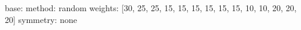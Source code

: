 base:
  method: random
  weights: [30, 25, 25, 15, 15, 15, 15, 15, 15, 10, 10, 20, 20, 20]
  symmetry: none